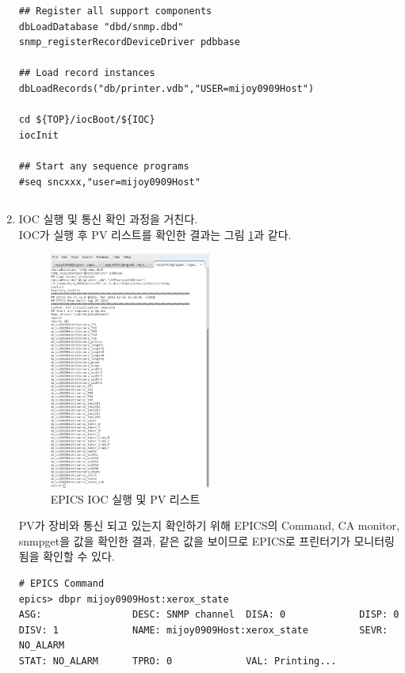 \documentclass[11pt
  , a4paper
  , article
  , oneside
]{memoir}
\begin{document}
\begin{enumerate}
\begin{lstlisting}[style=termstylenumber]
## Register all support components
dbLoadDatabase "dbd/snmp.dbd"
snmp_registerRecordDeviceDriver pdbbase

## Load record instances
dbLoadRecords("db/printer.vdb","USER=mijoy0909Host")

cd ${TOP}/iocBoot/${IOC}
iocInit

## Start any sequence programs
#seq sncxxx,"user=mijoy0909Host"
\end{lstlisting}

\begin{lstlisting}[style=termstyle]

\end{lstlisting}

\item IOC 실행 및 통신 확인 과정을 거친다.\\
IOC가 실행 후 PV 리스트를 확인한 결과는 그림 \ref{fig: printer_ioc}과 같다. 

\begin{figure}[h!]
  \centering
  	      \includegraphics[width=0.5\textwidth]{./images/printer_ioc.eps}
  \caption{EPICS IOC 실행 및 PV 리스트}
  	      \label{fig: printer_ioc}
\end{figure}

PV가 장비와 통신 되고 있는지 확인하기 위해 EPICS의 Command, CA monitor, snmpget을 값을 확인한 결과, 같은 값을 보이므로 EPICS로 프린터기가 모니터링됨을 확인할 수 있다.  
\begin{lstlisting}[style=termstyle]
# EPICS Command
epics> dbpr mijoy0909Host:xerox_state
ASG:                DESC: SNMP channel  DISA: 0             DISP: 0             
DISV: 1             NAME: mijoy0909Host:xerox_state         SEVR: NO_ALARM      
STAT: NO_ALARM      TPRO: 0             VAL: Printing...    
\end{lstlisting}


\end{enumerate}
\end{document}
